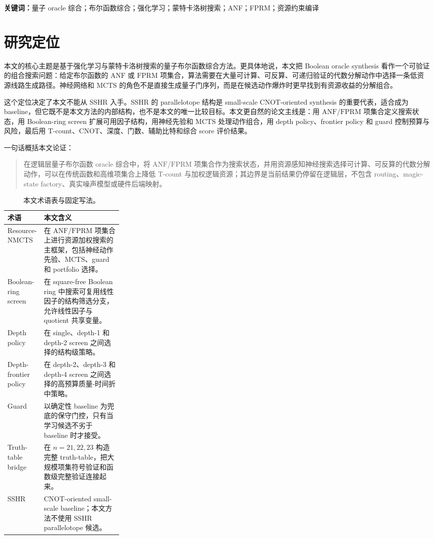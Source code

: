 \documentclass[UTF8,fontset=macnew,11pt]{ctexart}
\newcommand{\method}{Resource-NMCTS}
\newcommand{\screen}{Boolean-ring screen}
\newcommand{\anf}{\ensuremath{\mathrm{ANF}}}
\newcommand{\fprm}{\ensuremath{\mathrm{FPRM}}}
\newcommand{\mcts}{\ensuremath{\mathrm{MCTS}}}
\newcommand{\ttable}{truth-table}
\begin{document}
\noindent\textbf{关键词：}量子 oracle 综合；布尔函数综合；强化学习；蒙特卡洛树搜索；ANF；FPRM；资源约束编译

\section{研究定位}

本文的核心主题是基于强化学习与蒙特卡洛树搜索的量子布尔函数综合方法。更具体地说，本文把 Boolean oracle synthesis 看作一个可验证的组合搜索问题：给定布尔函数的 \anf{} 或 \fprm{} 项集合，算法需要在大量可计算、可反算、可递归验证的代数分解动作中选择一条低资源线路生成路径。神经网络和 \mcts{} 的角色不是直接生成量子门序列，而是在候选动作爆炸时更早找到有资源收益的分解组合。

这个定位决定了本文不能从 SSHR 入手。SSHR 的 parallelotope 结构是 small-scale CNOT-oriented synthesis 的重要代表，适合成为 baseline，但它既不是本文方法的内部结构，也不是本文的唯一比较目标。本文更自然的论文主线是：用 \anf{}/\fprm{} 项集合定义搜索状态，用 Boolean-ring screen 扩展可用因子结构，用神经先验和 \mcts{} 处理动作组合，用 depth policy、frontier policy 和 guard 控制预算与风险，最后用 T-count、CNOT、深度、门数、辅助比特和综合 score 评价结果。

一句话概括本文论证：

\begin{quote}
在逻辑层量子布尔函数 oracle 综合中，将 \anf{}/\fprm{} 项集合作为搜索状态，并用资源感知神经搜索选择可计算、可反算的代数分解动作，可以在传统函数和高维项集合上降低 T-count 与加权逻辑资源；其边界是当前结果仍停留在逻辑层，不包含 routing、magic-state factory、真实噪声模型或硬件后端映射。
\end{quote}

\begin{table}[H]
\centering
\small
\caption{本文术语表与固定写法。}
\label{tab:terms-v27}
\begin{tabularx}{\linewidth}{>{\raggedright\arraybackslash}p{0.27\linewidth}>{\raggedright\arraybackslash}X}
\toprule
术语 & 本文含义 \\
\midrule
\method{} & 在 \anf{}/\fprm{} 项集合上进行资源加权搜索的主框架，包括神经动作先验、\mcts{}、guard 和 portfolio 选择。 \\
\screen{} & 在 square-free Boolean ring 中搜索可复用线性因子的结构筛选分支，允许线性因子与 quotient 共享变量。 \\
Depth policy & 在 single、depth-1 和 depth-2 screen 之间选择的结构级策略。 \\
Depth-frontier policy & 在 depth-2、depth-3 和 depth-4 screen 之间选择的高预算质量-时间折中策略。 \\
Guard & 以确定性 baseline 为兜底的保守门控，只有当学习候选不劣于 baseline 时才接受。 \\
Truth-table bridge & 在 $n=21,22,23$ 构造完整 \ttable{}，把大规模项集符号验证和函数级完整验证连接起来。 \\
SSHR & CNOT-oriented small-scale baseline；本文方法不使用 SSHR parallelotope 候选。 \\
\bottomrule
\end{tabularx}
\end{table}
\end{document}
